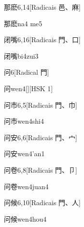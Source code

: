 \begin{entry}{那麽}{6,14}[Radicais ⾢、⿇]
  \begin{phonetics}{那麽}{na4 me5}
  \end{phonetics}
\end{entry}

\begin{entry}{闭嘴}{6,16}[Radicais ⾨、⼝]
  \begin{phonetics}{闭嘴}{bi4zui3}
  \end{phonetics}
\end{entry}

\begin{entry}{问}{6}[Radical ⾨]
  \begin{phonetics}{问}{wen4}[][HSK 1]
  \end{phonetics}
\end{entry}

\begin{entry}{问市}{6,5}[Radicais ⾨、⼱]
  \begin{phonetics}{问市}{wen4shi4}
  \end{phonetics}
\end{entry}

\begin{entry}{问安}{6,6}[Radicais ⾨、⼧]
  \begin{phonetics}{问安}{wen4'an1}
  \end{phonetics}
\end{entry}

\begin{entry}{问卷}{6,8}[Radicais ⾨、⼙]
  \begin{phonetics}{问卷}{wen4juan4}
  \end{phonetics}
\end{entry}

\begin{entry}{问候}{6,10}[Radicais ⾨、⼈]
  \begin{phonetics}{问候}{wen4hou4}
  \end{phonetics}
\end{entry}

